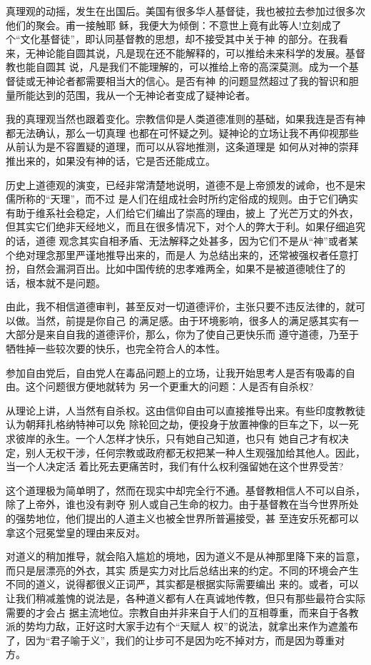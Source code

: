 ﻿\documentclass[11pt]{article}
\begin{document}
真理观的动摇，发生在出国后。美国有很多华人基督徒，我也被拉去参加过很多次他们的聚会。甫一接触耶
稣，我便大为倾倒：不意世上竟有此等人!立刻成了个``文化基督徒''，即认同基督教的思想，却不接受其中关于神
的部分。在我看来，无神论能自圆其说，凡是现在还不能解释的，可以推给未来科学的发展。基督教也能自圆其
说，凡是我们不能理解的，可以推给上帝的高深莫测。成为一个基督徒或无神论者都需要相当大的信心。是否有神
的问题显然超过了我的智识和胆量所能达到的范围，我从一个无神论者变成了疑神论者。

我的真理观当然也跟着变化。宗教信仰是人类道德准则的基础，如果我连是否有神都无法确认，那么一切真理
也都在可怀疑之列。疑神论的立场让我不再仰视那些从前认为是不容置疑的道理，而可以从容地推测，这条道理是
如何从对神的崇拜推出来的，如果没有神的话，它是否还能成立。

历史上道德观的演变，已经非常清楚地说明，道德不是上帝颁发的诫命，也不是宋儒所称的``天理''，而不过
是人们在组成社会时所约定俗成的规则。由于它们确实有助于维系社会稳定，人们给它们编出了崇高的理由，披上
了光芒万丈的外衣，但其实它们绝非天经地义，而且在很多情况下，对个人的弊大于利。如果仔细追究的话，道德
观念其实自相矛盾、无法解释之处甚多，因为它们不是从``神''或者某个绝对理念那里严谨地推导出来的，而是人
为总结出来的，还常被强权者任意打扮，自然会漏洞百出。比如中国传统的忠孝难两全，如果不是被道德唬住了的
话，根本就不是问题。

由此，我不相信道德审判，甚至反对一切道德评价，主张只要不违反法律的，就可以做。当然，前提是你自己
的满足感。由于环境影响，很多人的满足感其实有一大部分是来自自我的道德评价，那么，你为了使自己更快乐而
遵守道德，乃至于牺牲掉一些较次要的快乐，也完全符合人的本性。

参加自由党后，自由党人在毒品问题上的立场，让我开始思考人是否有吸毒的自由。这个问题很方便地就转为
另一个更重大的问题：人是否有自杀权?

从理论上讲，人当然有自杀权。这由信仰自由可以直接推导出来。有些印度教教徒认为朝拜扎格纳特神可以免
除轮回之劫，便投身于放置神像的巨车之下，以一死求彼岸的永生。一个人怎样才快乐，只有她自己知道，也只有
她自己才有权决定，别人无权干涉，任何宗教或政府都无权把某一种人生观强加给其他人。因此，当一个人决定活
着比死去更痛苦时，我们有什么权利强留她在这个世界受苦?

这个道理极为简单明了，然而在现实中却完全行不通。基督教相信人不可以自杀，除了上帝外，谁也没有剥夺
别人或自己生命的权力。由于基督教在当今世界所处的强势地位，他们提出的人道主义也被全世界所普遍接受，甚
至连安乐死都可以拿这个冠冕堂皇的理由来反对。

对道义的稍加推导，就会陷入尴尬的境地，因为道义不是从神那里降下来的旨意，而只是层漂亮的外衣，其实
质是实力对比后总结出来的约定。不同的环境会产生不同的道义，说得都很义正词严，其实都是根据实际需要编出
来的。或者，可以让我们稍减羞愧的说法是，各种道义都有人在真诚地传教，但只有那些最符合实际需要的才会占
据主流地位。宗教自由并非来自于人们的互相尊重，而来自于各教派的势均力敌，正好这时大家手边有个``天赋人
权''的说法，就拿出来作为遮羞布了，因为``君子喻于义''，我们的让步可不是因为吃不掉对方，而是因为尊重对
方。
\end{document}
